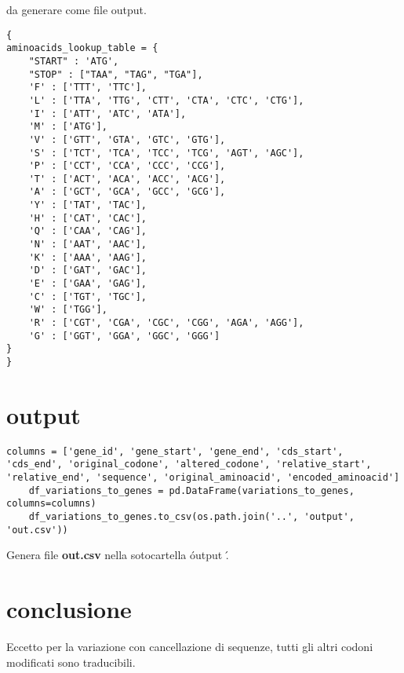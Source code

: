 \documentclass[11pt,italian]{article}
\begin{document}
	da generare come file output.
	\newpage
\begin{lstlisting}[basicstyle=\small\ttfamily,caption=Tabella per la traduzione in amminoacidi,label=code:aminoacids_table]
{
aminoacids_lookup_table = {
    "START" : 'ATG',
    "STOP" : ["TAA", "TAG", "TGA"],
    'F' : ['TTT', 'TTC'],
    'L' : ['TTA', 'TTG', 'CTT', 'CTA', 'CTC', 'CTG'],
    'I' : ['ATT', 'ATC', 'ATA'],
    'M' : ['ATG'],
    'V' : ['GTT', 'GTA', 'GTC', 'GTG'],
    'S' : ['TCT', 'TCA', 'TCC', 'TCG', 'AGT', 'AGC'],
    'P' : ['CCT', 'CCA', 'CCC', 'CCG'],
    'T' : ['ACT', 'ACA', 'ACC', 'ACG'],
    'A' : ['GCT', 'GCA', 'GCC', 'GCG'],
    'Y' : ['TAT', 'TAC'],
    'H' : ['CAT', 'CAC'],
    'Q' : ['CAA', 'CAG'],
    'N' : ['AAT', 'AAC'],
    'K' : ['AAA', 'AAG'],
    'D' : ['GAT', 'GAC'],
    'E' : ['GAA', 'GAG'],
    'C' : ['TGT', 'TGC'],
    'W' : ['TGG'],
    'R' : ['CGT', 'CGA', 'CGC', 'CGG', 'AGA', 'AGG'],
    'G' : ['GGT', 'GGA', 'GGC', 'GGG']
}
}
\end{lstlisting}	
	
\section{output}
\begin{lstlisting}[basicstyle=\small\ttfamily,caption=Generazione di output,label=code:output]
	columns = ['gene_id', 'gene_start', 'gene_end', 'cds_start', 'cds_end', 'original_codone', 'altered_codone', 'relative_start', 'relative_end', 'sequence', 'original_aminoacid', 'encoded_aminoacid']
	df_variations_to_genes = pd.DataFrame(variations_to_genes, columns=columns)
	df_variations_to_genes.to_csv(os.path.join('..', 'output', 'out.csv'))
\end{lstlisting}	
Genera file \textbf{out.csv} nella sotocartella \' output \' .

\section{conclusione}
Eccetto per la variazione con cancellazione di sequenze, tutti gli altri codoni modificati sono traducibili.
\end{document}
